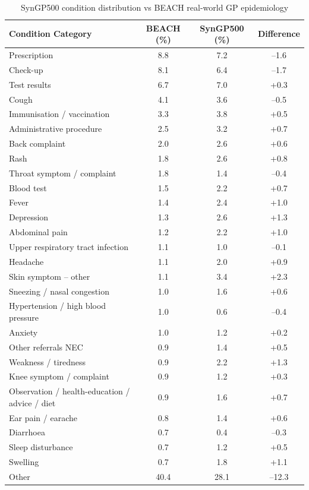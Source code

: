 \documentclass[11pt]{article}
\begin{document}
\begin{table}[h]
\centering
\scriptsize
\setlength{\tabcolsep}{3pt}
\caption{SynGP500 condition distribution vs BEACH real-world GP epidemiology}
\label{tab:beach-full}
\begin{tabular}{lccc}
\toprule
\textbf{Condition Category} & \textbf{BEACH (\%)} & \textbf{SynGP500 (\%)} & \textbf{Difference} \\
\midrule
Prescription & 8.8 & 7.2 & –1.6 \\
Check-up & 8.1 & 6.4 & –1.7 \\
Test results & 6.7 & 7.0 & +0.3 \\
Cough & 4.1 & 3.6 & –0.5 \\
Immunisation / vaccination & 3.3 & 3.8 & +0.5 \\
Administrative procedure & 2.5 & 3.2 & +0.7 \\
Back complaint & 2.0 & 2.6 & +0.6 \\
Rash & 1.8 & 2.6 & +0.8 \\
Throat symptom / complaint & 1.8 & 1.4 & –0.4 \\
Blood test & 1.5 & 2.2 & +0.7 \\
Fever & 1.4 & 2.4 & +1.0 \\
Depression & 1.3 & 2.6 & +1.3 \\
Abdominal pain & 1.2 & 2.2 & +1.0 \\
Upper respiratory tract infection & 1.1 & 1.0 & –0.1 \\
Headache & 1.1 & 2.0 & +0.9 \\
Skin symptom – other & 1.1 & 3.4 & +2.3 \\
Sneezing / nasal congestion & 1.0 & 1.6 & +0.6 \\
Hypertension / high blood pressure & 1.0 & 0.6 & –0.4 \\
Anxiety & 1.0 & 1.2 & +0.2 \\
Other referrals NEC & 0.9 & 1.4 & +0.5 \\
Weakness / tiredness & 0.9 & 2.2 & +1.3 \\
Knee symptom / complaint & 0.9 & 1.2 & +0.3 \\
Observation / health-education / advice / diet & 0.9 & 1.6 & +0.7 \\
Ear pain / earache & 0.8 & 1.4 & +0.6 \\
Diarrhoea & 0.7 & 0.4 & –0.3 \\
Sleep disturbance & 0.7 & 1.2 & +0.5 \\
Swelling & 0.7 & 1.8 & +1.1 \\
Other & 40.4 & 28.1 & –12.3 \\
\bottomrule
\end{tabular}
\end{table}
\end{document}
